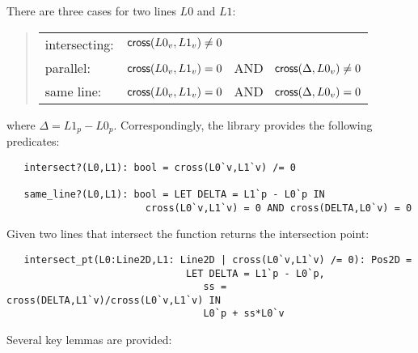 \documentclass[12pt]{article}
\begin{document}
There are three cases for two lines $L0$ and $L1$:
\begin{quote}
\begin{tabular}{lp{4.4in}}
      intersecting: &   ${\sf cross}(L0_v,L1_v) \neq 0$ \\
      parallel:     &   ${\sf cross}(L0_v,L1_v) =  0$ ~AND~
                        ${\sf cross}(\Delta,L0_v) \neq 0$ \\
      same line:    &   ${\sf cross}(L0_v,L1_v) =  0$ ~AND~
                        ${\sf cross}(\Delta,L0_v) = 0$ \\
\end{tabular}
\end{quote}
where $\Delta = L1_p - L0_p$.
Correspondingly, the library provides the following predicates:
\begin{verbatim}
   intersect?(L0,L1): bool = cross(L0`v,L1`v) /= 0 

   same_line?(L0,L1): bool = LET DELTA = L1`p - L0`p IN  
                        cross(L0`v,L1`v) = 0 AND cross(DELTA,L0`v) = 0
\end{verbatim}
Given two lines that intersect the function  returns
the intersection point:
\begin{verbatim}
   intersect_pt(L0:Line2D,L1: Line2D | cross(L0`v,L1`v) /= 0): Pos2D =
                               LET DELTA = L1`p - L0`p,
                                  ss = cross(DELTA,L1`v)/cross(L0`v,L1`v) IN 
                                  L0`p + ss*L0`v
\end{verbatim}
Several key lemmas are provided:
\end{document}
